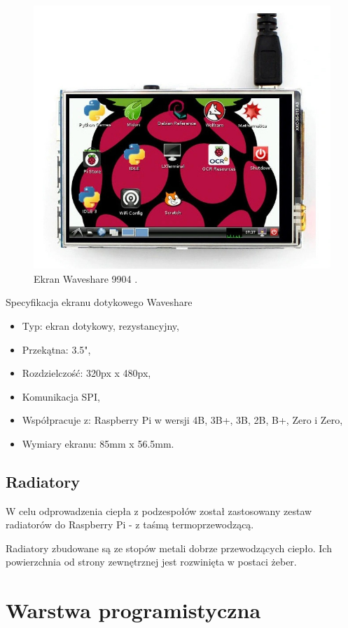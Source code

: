\documentclass[a4paper,12pt,reqno]{article}
\begin{document}
\begin{figure}[H]%
\centering
\includegraphics[width=0.8\columnwidth]{imgs/ekran.jpg}
\caption{Ekran Waveshare 9904 \cite{img_screen}. \label{ekran}}
\quad
\end{figure}

Specyfikacja ekranu dotykowego Waveshare

\begin{itemize}
	\item Typ: ekran dotykowy, rezystancyjny,
	\item Przekątna: 3.5",
	\item Rozdzielczość: 320px x 480px,
	\item Komunikacja SPI,
	\item Współpracuje z: Raspberry Pi w wersji 4B, 3B+, 3B, 2B, B+, Zero i Zero,
	\item Wymiary ekranu: 85mm x 56.5mm.
\end{itemize}

\subsection{Radiatory}

W celu odprowadzenia ciepła z podzespołów został zastosowany zestaw radiatorów do Raspberry Pi - z taśmą termoprzewodzącą.

Radiatory zbudowane są ze stopów metali dobrze przewodzących ciepło. Ich powierzchnia od strony zewnętrznej jest rozwinięta w postaci żeber.

\newpage
\section{Warstwa programistyczna} \label{section:warstwa_programistyczna}
\end{document}
